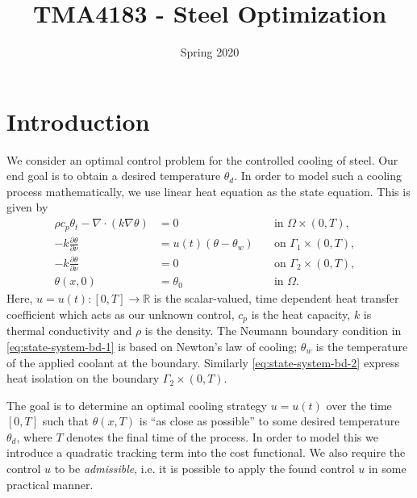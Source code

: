 \documentclass{article}
\title{TMA4183 - Steel Optimization}
\author{}
\date{Spring 2020}
\begin{document}
\maketitle

\section{Introduction}
We consider an optimal control problem for the controlled cooling of steel. Our end goal is to obtain a desired temperature $\theta_d$. In order to model such a cooling process mathematically, we use linear heat equation as the state equation. This is given by
\begin{subequations}
   \label{eq:heat}
   \begin{align}
      \rho c_p \theta_t - \nabla \cdot (k \nabla \theta) &= 0 \quad &\text{in } \Omega \times (0,T),\label{eq:heat-in-omega} \\
      -k \frac{\partial \theta}{\partial \nu} &= u(t) (\theta - \theta_w) \quad &\text{on } \Gamma_1 \times (0,T), \label{eq:state-system-bd-1} \\
      -k \frac{\partial \theta}{\partial \nu} &= 0 \quad &\text{on } \Gamma_2 \times (0,T), \label{eq:state-system-bd-2} \\
      \theta(x, 0) &= \theta_0 &\text{in } \Omega. &
   \end{align}
\end{subequations}
Here, $u = u(t) \colon [0, T] \to \mathbb{R}$ is the scalar-valued, time dependent heat transfer coefficient which acts as our unknown control, $c_p$ is the heat capacity, $k$ is thermal conductivity and $\rho$ is the density. The Neumann boundary condition in \eqref{eq:state-system-bd-1} is based on Newton's law of cooling; $\theta_w$ is the temperature of the applied coolant at the boundary. Similarly \eqref{eq:state-system-bd-2} express heat isolation on the boundary $\Gamma_2 \times (0,T)$. \bigskip 

The goal is to determine an optimal cooling strategy $u=u(t)$ over the time $[0,T]$ such that $\theta(x, T)$ is ``as close as possible'' to some desired temperature $\theta_d$, where $T$ denotes the final time of the process. In order to model this we introduce a quadratic tracking term into the cost functional. We also require the control $u$ to be \emph{admissible}, i.e. it is possible to apply the found control $u$ in some practical manner.
\end{document}
